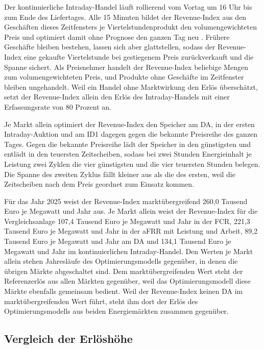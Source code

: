 Der kontinuierliche Intraday-Handel läuft rollierend vom Vortag um 16 Uhr bis zum Ende des Liefertages.
Alle 15 Minuten bildet der Revenue-Index aus den Geschäften dieses Zeitfensters je Viertelstundenprodukt den volumengewichteten Preis und optimiert damit ohne Prognose den ganzen Tag neu \cite{semmelmann_algorithm_2024}.
Frühere Geschäfte bleiben bestehen, lassen sich aber glattstellen, sodass der Revenue-Index eine gekaufte Viertelstunde bei gestiegenem Preis zurückverkauft und die Spanne sichert.
Als Preisnehmer handelt der Revenue-Index beliebige Mengen zum volumengewichteten Preis, und Produkte ohne Geschäfte im Zeitfenster bleiben ungehandelt.
Weil ein Handel ohne Marktwirkung den Erlös überschätzt, setzt der Revenue-Index allein den Erlös des Intraday-Handels mit einer Erfassungsrate von 80 Prozent an.

Je Markt allein optimiert der Revenue-Index den Speicher am \ac{DA}, in der ersten Intraday-Auktion und am \ac{ID1} dagegen gegen die bekannte Preisreihe des ganzen Tages.
Gegen die bekannte Preisreihe lädt der Speicher in den günstigsten und entlädt in den teuersten Zeitscheiben, sodass bei zwei Stunden Energieinhalt je Leistung zwei Zyklen die vier günstigsten und die vier teuersten Stunden belegen.
Die Spanne des zweiten Zyklus fällt kleiner aus als die des ersten, weil die Zeitscheiben nach dem Preis geordnet zum Einsatz kommen.

Für das Jahr 2025 weist der Revenue-Index marktübergreifend 260,0 Tausend Euro je Megawatt und Jahr aus.
Je Markt allein weist der Revenue-Index für die Vergleichsanlage 107,4 Tausend Euro je Megawatt und Jahr in der \ac{FCR}, 221,3 Tausend Euro je Megawatt und Jahr in der \ac{aFRR} mit Leistung und Arbeit, 89,2 Tausend Euro je Megawatt und Jahr am \ac{DA} und 134,1 Tausend Euro je Megawatt und Jahr im kontinuierlichen Intraday-Handel.
Den Werten je Markt allein stehen Jahresläufe des Optimierungsmodells gegenüber, in denen die übrigen Märkte abgeschaltet sind.
Dem marktübergreifenden Wert steht der Referenzerlös aus allen Märkten gegenüber, weil das Optimierungsmodell diese Märkte ebenfalls gemeinsam bedient.
Weil der Revenue-Index keinen \ac{DA} im marktübergreifenden Wert führt, steht ihm dort der Erlös des Optimierungsmodells aus beiden Energiemärkten zusammen gegenüber.

\subsection{Vergleich der Erlöshöhe}
\label{sec:validation_differences}

